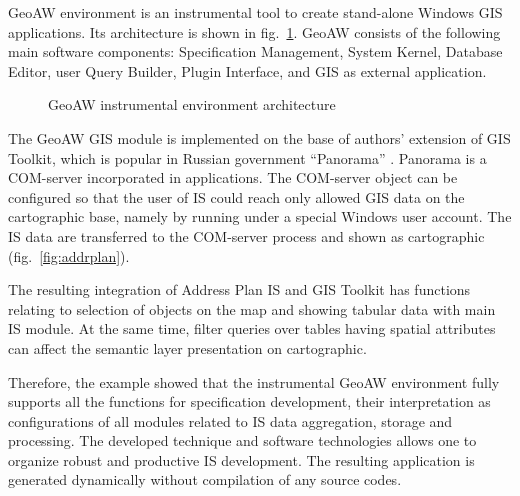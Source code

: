 \documentclass[conference]{IEEEtran}
\begin{document}
GeoAW environment is an instrumental tool to create stand-alone Windows GIS applications.  Its architecture is shown in fig.~\ref{fig:architecture}.  GeoAW consists of the following main software components: Specification Management,  System Kernel, Database Editor, user Query Builder, Plugin Interface, and GIS as external application.

\begin{figure}[b]
  \centering
  \begingroup
  \def\svgwidth{\linewidth}
  \tiny\sffamily
  \def\db{Database}
  \def\spec{Specification}
  \def\sce{\vtop{Specification\break Management}}
  \def\kerne{Kernel}
  \def\bde{\vtop{Database\break Editor}}
  \def\qb{\vtop{Query\break Builder}}
  \def\map{GIS}
  \def\gb{Graphic Base}
  \def\plug{Plugins}
  \def\intfs{\vtop{Plugin\break Interface}}
  
  \endgroup
  \caption{GeoAW instrumental environment architecture}
  \label{fig:architecture}
\end{figure}

The GeoAW GIS module is implemented on the base of authors' extension of GIS Toolkit, which is popular in Russian government  ``Panorama'' \cite{b42}. Panorama is a COM-server incorporated in applications.  The COM-server object can be configured so that the user of IS could reach only allowed GIS data on the cartographic base, namely by running under a special Windows user account.  The IS data are transferred to the COM-server process and  shown as cartographic (fig.~\ref{fig:addrplan}).

The resulting integration of Address Plan IS and GIS Toolkit has functions relating to selection of objects on the map and showing tabular data with main IS module.  At the same time, filter queries over tables having spatial attributes can affect the semantic layer presentation on cartographic.

Therefore, the example showed that the instrumental GeoAW environment fully supports all the functions for specification development, their interpretation as configurations of all modules related to IS data aggregation, storage and processing.  The developed technique and software technologies allows one to organize robust and productive IS development.  The resulting application is generated dynamically without compilation of any source codes.

%
%
\end{document}
